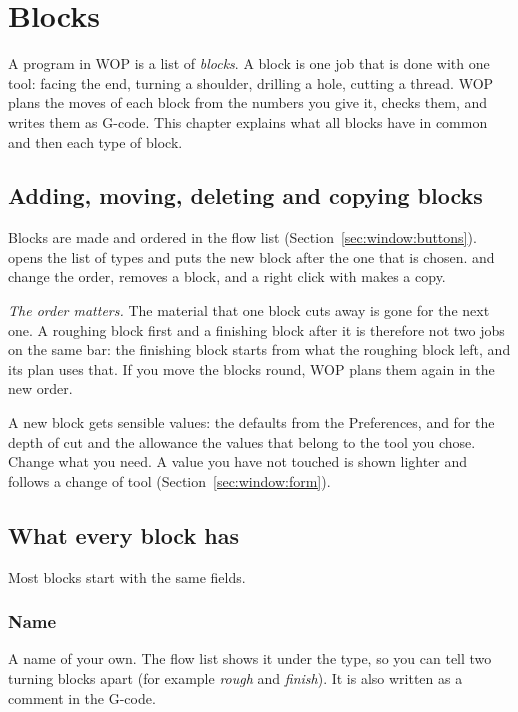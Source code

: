 \chapter{Blocks}\label{ch:blocks}

A program in WOP is a list of \emph{blocks}. A block is one job that is done with one tool: facing the end, turning a shoulder, drilling a hole, cutting a thread. WOP plans the moves of each block from the numbers you give it, checks them, and writes them as G-code. This chapter explains what all blocks have in common and then each type of block.

\section{Adding, moving, deleting and copying blocks}\label{sec:blocks:flow}

Blocks are made and ordered in the flow list (Section~\ref{sec:window:buttons}).  opens the list of types and puts the new block after the one that is chosen.  and  change the order,  removes a block, and a right click with  makes a copy.

\emph{The order matters.} The material that one block cuts away is gone for the next one. A roughing block first and a finishing block after it is therefore not two jobs on the same bar: the finishing block starts from what the roughing block left, and its plan uses that. If you move the blocks round, WOP plans them again in the new order.

A new block gets sensible values: the defaults from the Preferences, and for the depth of cut and the allowance the values that belong to the tool you chose. Change what you need. A value you have not touched is shown lighter and follows a change of tool (Section~\ref{sec:window:form}).

\section{What every block has}\label{sec:blocks:common}

Most blocks start with the same fields.

\subsection{Name}
A name of your own. The flow list shows it under the type, so you can tell two turning blocks apart (for example \emph{rough} and \emph{finish}). It is also written as a comment in the G-code.

